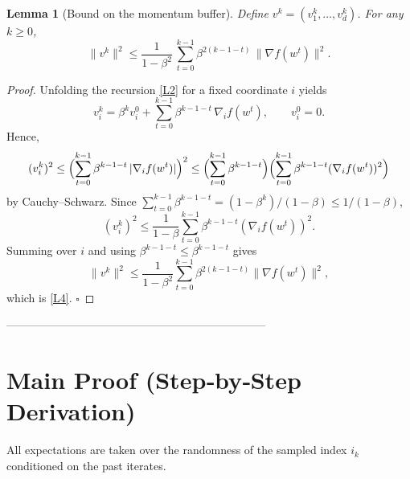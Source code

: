 \documentclass{article}
\newtheorem{lemma}{Lemma}
\begin{document}
\begin{lemma}[Bound on the momentum buffer]\label{lem:momentum-bound}
Define $v^{k}=(v^{k}_1,\dots,v^{k}_d)$. For any $k\ge0$,
\[
\|v^{k}\|^{2}\le \frac{1}{1-\beta^{2}}\,
\sum_{t=0}^{k-1}\beta^{2(k-1-t)}\,
\|\nabla f(w^{t})\|^{2}.
\tag{L4}
\]
\end{lemma}
\begin{proof}
Unfolding the recursion \eqref{L2} for a fixed coordinate $i$ yields
\[
v_i^{k}= \beta^{k}v_i^{0}
        +\sum_{t=0}^{k-1}\beta^{k-1-t}\,\nabla_i f(w^{t}),
\qquad v_i^{0}=0.
\]
Hence,
\[
(v_i^{k})^{2}
\le\Bigl(\sum_{t=0}^{k-1}\beta^{k-1-t}\,|\nabla_i f(w^{t})|\Bigr)^{2}
\le\Bigl(\sum_{t=0}^{k-1}\beta^{k-1-t}\Bigr)
      \Bigl(\sum_{t=0}^{k-1}\beta^{k-1-t}(\nabla_i f(w^{t}))^{2}\Bigr)
\]
by Cauchy–Schwarz. Since $\sum_{t=0}^{k-1}\beta^{k-1-t}= (1-\beta^{k})/(1-\beta)\le 1/(1-\beta)$,
\[
(v_i^{k})^{2}\le\frac{1}{1-\beta}\sum_{t=0}^{k-1}\beta^{k-1-t}(\nabla_i f(w^{t}))^{2}.
\]
Summing over $i$ and using $\beta^{k-1-t}\le\beta^{k-1-t}$ gives
\[
\|v^{k}\|^{2}\le\frac{1}{1-\beta^{2}}
\sum_{t=0}^{k-1}\beta^{2(k-1-t)}\|\nabla f(w^{t})\|^{2},
\]
which is \eqref{L4}. $\square$
\end{proof}

---------------------------------------------------------------------

\section*{Main Proof (Step‑by‑Step Derivation)}
All expectations are taken over the randomness of the sampled index $i_k$
conditioned on the past iterates.
\end{document}
